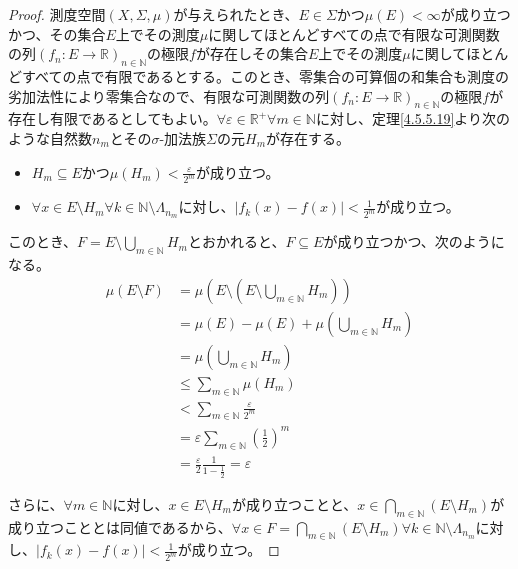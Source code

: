 \documentclass[dvipdfmx]{jsarticle}
\begin{document}
\begin{proof}
測度空間$(X,\varSigma,\mu)$が与えられたとき、$E \in \varSigma$かつ$\mu(E) < \infty$が成り立つかつ、その集合$E$上でその測度$\mu$に関してほとんどすべての点で有限な可測関数の列$\left( f_{n}:E \rightarrow \mathbb{R} \right)_{n \in \mathbb{N}}$の極限$f$が存在しその集合$E$上でその測度$\mu$に関してほとんどすべての点で有限であるとする。このとき、零集合の可算個の和集合も測度の劣加法性により零集合なので、有限な可測関数の列$\left( f_{n}:E \rightarrow \mathbb{R} \right)_{n \in \mathbb{N}}$の極限$f$が存在し有限であるとしてもよい。$\forall\varepsilon \in \mathbb{R}^{+}\forall m \in \mathbb{N}$に対し、定理\ref{4.5.5.19}より次のような自然数$n_{m}$とその$\sigma$-加法族$\varSigma$の元$H_{m}$が存在する。
\begin{itemize}
\item
  $H_{m} \subseteq E$かつ$\mu\left( H_{m} \right) < \frac{\varepsilon}{2^{m}}$が成り立つ。
\item
  $\forall x \in E \setminus H_{m}\forall k \in \mathbb{N} \setminus \varLambda_{n_{m}}$に対し、$\left| f_{k}(x) - f(x) \right| < \frac{1}{2^{m}}$が成り立つ。
\end{itemize}
このとき、$F = E \setminus \bigcup_{m \in \mathbb{N}} H_{m}$とおかれると、$F \subseteq E$が成り立つかつ、次のようになる。
\begin{align*}
\mu(E \setminus F) &= \mu\left( E \setminus \left( E \setminus \bigcup_{m \in \mathbb{N}} H_{m} \right) \right)\\
&= \mu(E) - \mu(E) + \mu\left( \bigcup_{m \in \mathbb{N}} H_{m} \right)\\
&= \mu\left( \bigcup_{m \in \mathbb{N}} H_{m} \right)\\
&\leq \sum_{m \in \mathbb{N}} {\mu\left( H_{m} \right)}\\
&< \sum_{m \in \mathbb{N}} \frac{\varepsilon}{2^{m}}\\
&= \varepsilon\sum_{m \in \mathbb{N}} \left( \frac{1}{2} \right)^{m}\\
&= \frac{\varepsilon}{2}\frac{1}{1 - \frac{1}{2}} = \varepsilon
\end{align*}\par
さらに、$\forall m \in \mathbb{N}$に対し、$x \in E \setminus H_{m}$が成り立つことと、$x \in \bigcap_{m \in \mathbb{N}} \left( E \setminus H_{m} \right)$が成り立つこととは同値であるから、$\forall x \in F = \bigcap_{m \in \mathbb{N}} \left( E \setminus H_{m} \right)\forall k \in \mathbb{N} \setminus \varLambda_{n_{m}}$に対し、$\left| f_{k}(x) - f(x) \right| < \frac{1}{2^{m}}$が成り立つ。
\end{proof}
\end{document}

